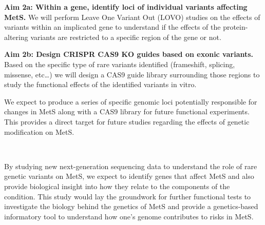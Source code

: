 \documentclass[11pt]{article}
\begin{document}
\textbf{Aim 2a: Within a gene, identify loci of individual variants affecting MetS.} We will perform Leave One Variant Out (LOVO) studies on the effects of variants within an implicated gene to understand if the effects of the protein-altering variants are restricted to a specific region of the gene or not.

\textbf{Aim 2b: Design CRISPR CAS9 KO guides based on exonic variants.} Based on the specific type of rare variants identified (frameshift, splicing, missense, etc…) we will design a CAS9 guide library surrounding those regions to study the functional effects of the identified variants in vitro.

We expect to produce a series of specific genomic loci potentially responsible for changes in MetS along with a CAS9 library for future functional experiments. This provides a direct target for future studies regarding the effects of genetic modification on MetS.

\

By studying new next-generation sequencing data to understand the role of rare genetic variants on MetS, we expect to identify genes that affect MetS and also provide biological insight into how they relate to the components of the condition. This study would lay the groundwork for further functional tests to investigate the biology behind the genetics of MetS and provide a genetics-based informatory tool to understand how one's genome contributes to risks in MetS.



\newpage

 

\end{document}
